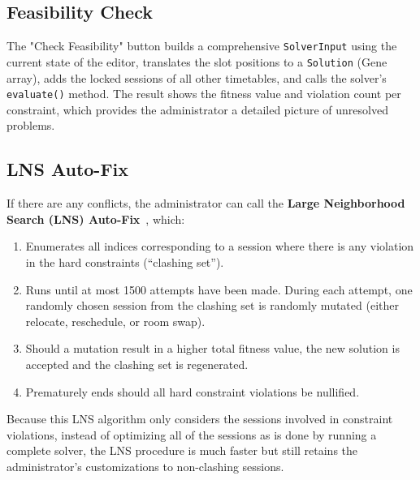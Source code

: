 \subsection{Feasibility Check}

The "Check Feasibility" button builds a comprehensive \texttt{SolverInput} using the current state of the editor, translates the slot positions to a \texttt{Solution} (Gene array), adds the locked sessions of all other timetables, and calls the solver's \texttt{evaluate()} method. The result shows the fitness value and violation count per constraint, which provides the administrator a detailed picture of unresolved problems.

\subsection{LNS Auto-Fix}

If there are any conflicts, the administrator can call the \textbf{Large Neighborhood Search (LNS) Auto-Fix}~\cite{shaw1998using}, which:

\begin{enumerate}
    \item Enumerates all indices corresponding to a session where there is any violation in the hard constraints (``clashing set''). 
    \item Runs until at most 1500 attempts have been made. During each attempt, one randomly chosen session from the clashing set is randomly mutated (either relocate, reschedule, or room swap).
    \item Should a mutation result in a higher total fitness value, the new solution is accepted and the clashing set is regenerated.  
    \item Prematurely ends should all hard constraint violations be nullified. 
\end{enumerate}

Because this LNS algorithm only considers the sessions involved in constraint violations, instead of optimizing all of the sessions as is done by running a complete solver, the LNS procedure is much faster but still retains the administrator's customizations to non-clashing sessions.


